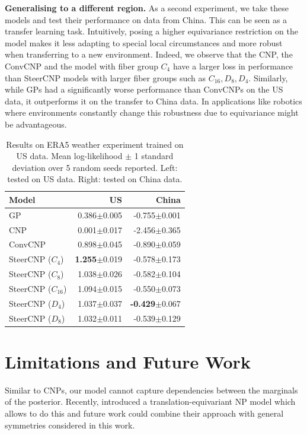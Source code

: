 \textbf{Generalising to a different region.}
As a second experiment, we take these models and test their performance on data from China.
This can be seen as a transfer learning task.
Intuitively, posing a higher equivariance restriction on the model makes it less adapting to special local circumstances and more robust when transferring to a new environment.
Indeed, we observe that the CNP, the ConvCNP and the model with fiber group $C_4$ have a larger loss in performance than SteerCNP models with larger fiber groups such as $C_{16},D_{8},D_4$.
Similarly, while GPs had a significantly worse performance than ConvCNPs on the US data, it outperforms it on the transfer to China data.
In applications like robotics where environments constantly change this robustness due to equivariance might be advantageous.
\begin{table}[t]
	\centering
	\small
	\caption{Results on ERA5 weather experiment trained on US data.
		Mean log-likelihood $\pm$ 1 standard deviation over 5 random seeds reported.
		Left: tested on US data.
		Right: tested on China data.
	}
	\begin{tabular}[b]{lrr}
		\toprule
		\textbf{Model}   & US                       & China            \\
		\midrule
		GP               & 0.386$\pm$0.005          & -0.755$\pm$0.001 \\
		CNP              & 0.001$\pm$0.017          & -2.456$\pm$0.365 \\
		ConvCNP          & 0.898$\pm$0.045          & -0.890$\pm$0.059 \\
		\midrule
		SteerCNP ($C_4$) & \textbf{1.255}$\pm$0.019 & -0.578$\pm$0.173 \\ SteerCNP ($C_{8}$) & 1.038$\pm$0.026& -0.582$\pm$0.104\\ SteerCNP ($C_{16}$) & 1.094$\pm$0.015& -0.550$\pm$0.073\\ SteerCNP ($D_4$) & 1.037$\pm$0.037& \textbf{-0.429}$\pm$0.067 \\ SteerCNP ($D_8$) & 1.032$\pm$0.011& -0.539$\pm$0.129\\ \bottomrule\end{tabular} \label{table:ERA5_results} \end{table}

\section{Limitations and Future Work}
Similar to CNPs, our model cannot capture dependencies between the marginals of the posterior.
Recently, \textcite{ConvNP} introduced a translation-equivariant NP model which allows to do this and future work could combine their approach with general symmetries considered in this work.

